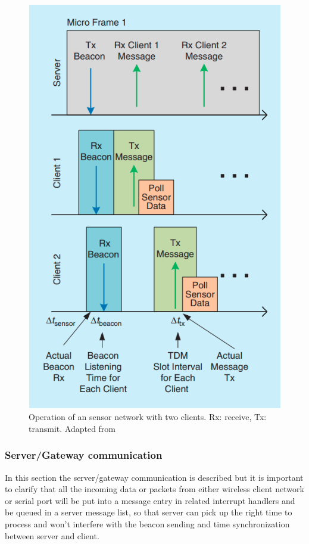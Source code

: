 \documentclass[journal]{IEEEtran}	%
\begin{document}
\begin{figure}[t]
\centering
\includegraphics[width=0.8\columnwidth]{fig9.png}
\caption{Operation of an sensor network with two clients. Rx: receive, Tx: transmit. Adapted from \cite{williams2017weaving}}
\label{fig:beacons}
\end{figure}

\subsubsection{Server/Gateway communication}

In this section the server/gateway communication is described but it is important to clarify that all the incoming data or packets from either wireless client network or serial port will be put into a message entry in related interrupt handlers and be queued in a server message list, so that server can pick up the right time to process and won’t interfere with the beacon sending and time synchronization between server and client.
\end{document}
